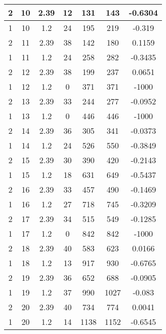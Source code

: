 \documentclass[letterpaper, 12pt]{article}
\begin{document}
\begin{longtable}{|c|c|c|c|c|c|c|}
\hline
2 & 10 & 2.39 & 12 & 131 & 143 & -0.6304 \\
\hline
1 & 10 & 1.2 & 24 & 195 & 219 & -0.319 \\
\hline
2 & 11 & 2.39 & 38 & 142 & 180 & 0.1159 \\
\hline
1 & 11 & 1.2 & 24 & 258 & 282 & -0.3435 \\
\hline
2 & 12 & 2.39 & 38 & 199 & 237 & 0.0651 \\
\hline
1 & 12 & 1.2 & 0 & 371 & 371 & -1000 \\
\hline
2 & 13 & 2.39 & 33 & 244 & 277 & -0.0952 \\
\hline
1 & 13 & 1.2 & 0 & 446 & 446 & -1000 \\
\hline
2 & 14 & 2.39 & 36 & 305 & 341 & -0.0373 \\
\hline
1 & 14 & 1.2 & 24 & 526 & 550 & -0.3849 \\
\hline
2 & 15 & 2.39 & 30 & 390 & 420 & -0.2143 \\
\hline
1 & 15 & 1.2 & 18 & 631 & 649 & -0.5437 \\
\hline
2 & 16 & 2.39 & 33 & 457 & 490 & -0.1469 \\
\hline
1 & 16 & 1.2 & 27 & 718 & 745 & -0.3209 \\
\hline
2 & 17 & 2.39 & 34 & 515 & 549 & -0.1285 \\
\hline
1 & 17 & 1.2 & 0 & 842 & 842 & -1000 \\
\hline
2 & 18 & 2.39 & 40 & 583 & 623 & 0.0166 \\
\hline
1 & 18 & 1.2 & 13 & 917 & 930 & -0.6765 \\
\hline
2 & 19 & 2.39 & 36 & 652 & 688 & -0.0905 \\
\hline
1 & 19 & 1.2 & 37 & 990 & 1027 & -0.083 \\
\hline
2 & 20 & 2.39 & 40 & 734 & 774 & 0.0041 \\
\hline
1 & 20 & 1.2 & 14 & 1138 & 1152 & -0.6545 \\
\hline
\end{longtable}
\end{document}

